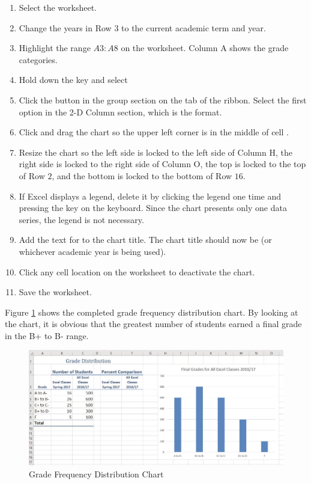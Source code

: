 \begin{enumerate}
	\item Select the  worksheet.
	\item Change the years in Row $ 3 $ to the current academic term and year.
	\item Highlight the range $ A3:A8 $ on the  worksheet. Column A shows the grade categories.
	\item Hold down the  key and select 
	\item Click the  button in the  group section on the  tab of the ribbon. Select the first option in the 2-D Column section, which is the  format.
	\item Click and drag the chart so the upper left corner is in the middle of cell .
	\item Resize the chart so the left side is locked to the left side of Column H, the right side is locked to the right side of Column O, the top is locked to the top of Row $ 2 $, and the bottom is locked to the bottom of Row $ 16 $.
	\item If Excel displays a legend, delete it by clicking the legend one time and pressing the  key on the keyboard. Since the chart presents only one data series, the legend is not necessary.
	\item Add the text  for to the chart title. The chart title should now be  (or whichever academic year is being used).
	\item Click any cell location on the  worksheet to deactivate the chart.
	\item Save the worksheet.
\end{enumerate}

Figure \ref{04:fig13} shows the completed grade frequency distribution chart. By looking at the chart, it is obvious that the greatest number of students earned a final grade in the B+ to B- range.

\begin{figure}[H]
	\centering
	\includegraphics[width=\maxwidth{.95\linewidth}]{gfx/ch04_fig13}
	\caption{Grade Frequency Distribution Chart}
	\label{04:fig13}
\end{figure}

